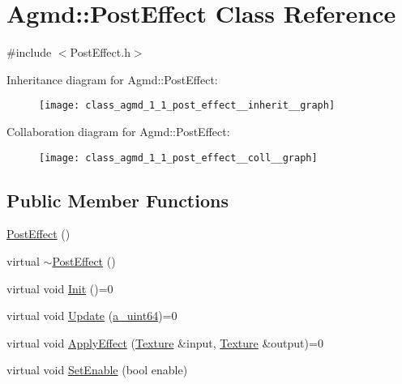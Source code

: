 \hypertarget{class_agmd_1_1_post_effect}{\section{Agmd\+:\+:Post\+Effect Class Reference}
\label{class_agmd_1_1_post_effect}
}


{\ttfamily \#include $<$Post\+Effect.\+h$>$}



Inheritance diagram for Agmd\+:\+:Post\+Effect\+:\nopagebreak
\begin{figure}[H]
\begin{center}
\leavevmode
\texttt{[image: class\_agmd\_1\_1\_post\_effect\_\_inherit\_\_graph]}
\end{center}
\end{figure}


Collaboration diagram for Agmd\+:\+:Post\+Effect\+:\nopagebreak
\begin{figure}[H]
\begin{center}
\leavevmode
\texttt{[image: class\_agmd\_1\_1\_post\_effect\_\_coll\_\_graph]}
\end{center}
\end{figure}
\subsection*{Public Member Functions}
\begin{DoxyCompactItemize}
\item 
\hyperlink{class_agmd_1_1_post_effect_a4e4092d7237f6992a339f186a9b4a033}{Post\+Effect} ()
\item 
virtual \hyperlink{class_agmd_1_1_post_effect_a0b7086103d480850b0d0f0c7833de85f}{$\sim$\+Post\+Effect} ()
\item 
virtual void \hyperlink{class_agmd_1_1_post_effect_a0fc04d1fa9c626d7afd1bb3ad9650fc7}{Init} ()=0
\item 
virtual void \hyperlink{class_agmd_1_1_post_effect_a7fa3e1ad3a588dce0f9f51db8b420c91}{Update} (\hyperlink{_common_defines_8h_a6c5192ec3c55d6e5b13d2dbaa082bdea}{a\+\_\+uint64})=0
\item 
virtual void \hyperlink{class_agmd_1_1_post_effect_a853f68fdefbb0450851bc8f4539ec4db}{Apply\+Effect} (\hyperlink{class_agmd_1_1_texture}{Texture} \&input, \hyperlink{class_agmd_1_1_texture}{Texture} \&output)=0
\item 
virtual void \hyperlink{class_agmd_1_1_post_effect_a0b880bab27c99b780712ac1d93a92307}{Set\+Enable} (bool enable)
\end{DoxyCompactItemize}
